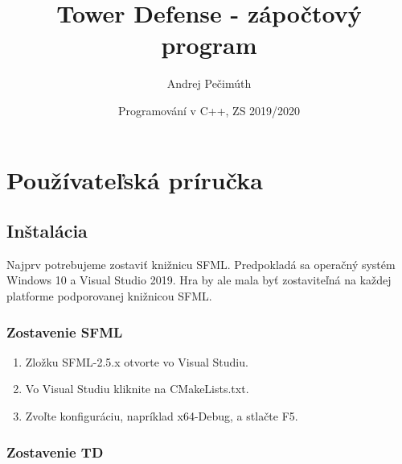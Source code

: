 \documentclass[12pt]{article}
\title{Tower Defense - zápočtový program}
\author{Andrej Pečimúth}
\date{Programování v C++, ZS 2019/2020}
\begin{document}
\maketitle

\section{Používateľská príručka}

\subsection{Inštalácia}
Najprv potrebujeme zostaviť knižnicu SFML. Predpokladá sa operačný systém Windows 10
a Visual Studio 2019. Hra by ale mala byť zostaviteľná na každej platforme podporovanej
knižnicou SFML.

\subsubsection{Zostavenie SFML}

\begin{enumerate}
    \item Zložku SFML-2.5.x otvorte vo Visual Studiu.
    \item Vo Visual Studiu kliknite na CMakeLists.txt.
    \item Zvoľte konfiguráciu, napríklad x64-Debug, a stlačte F5.
\end{enumerate}

\subsubsection{Zostavenie TD}
\end{document}
